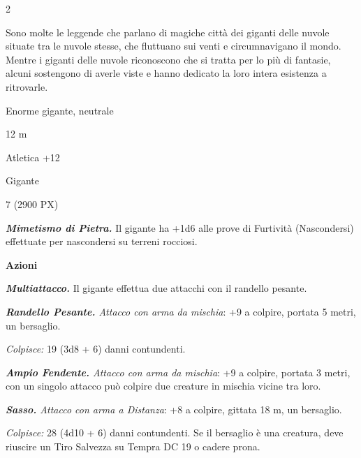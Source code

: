 \begin{multicols}{2}
{Sono molte le leggende che parlano di magiche città dei giganti delle nuvole situate tra le nuvole stesse, che fluttuano sui venti e circumnavigano il mondo. Mentre i giganti delle nuvole riconoscono che si tratta per lo più di fantasie, alcuni sostengono di averle viste e hanno dedicato la loro intera esistenza a ritrovarle.

\begin{description}[noitemsep, topsep=0pt, parsep=0pt, partopsep=0pt, itemsep=1pt, leftmargin=2.35cm,  labelwidth=2.2cm, itemindent=0cm, listparindent=0pt] %
\setlength{\baselineskip}{10pt}
\item[\textbf{Taglia/Tipo}] Enorme gigante, neutrale
\item[\textbf{Caratt.}] 
\item[\textbf{Punti Ferita}] 
\item[\textbf{Movimento}] 12 m
\item[\textbf{Tiri Salvez.}] 
\item[\textbf{Comp.}] Atletica +12
\item[\textbf{Sensi}] 
\item[\textbf{Linguaggi}] Gigante
\item[\textbf{Sfida}] 7 (2900 PX)
\end{description}
\smallskip

\emph{\textbf{Mimetismo di Pietra.}} Il gigante ha +1d6 alle prove di Furtività (Nascondersi) effettuate per nascondersi su terreni rocciosi.

\textbf{Azioni}

\emph{\textbf{Multiattacco.}} Il gigante effettua due attacchi con il randello pesante.

\emph{\textbf{Randello Pesante.} Attacco con arma da mischia}: +9 a colpire, portata 5 metri, un bersaglio.

\emph{Colpisce:} 19 (3d8 + 6) danni contundenti.

\emph{\textbf{Ampio Fendente.} Attacco con arma da mischia}: +9 a colpire, portata 3 metri, con un singolo attacco può colpire due creature in mischia vicine tra loro.

\emph{\textbf{Sasso.} Attacco con arma a Distanza}: +8 a colpire, gittata 18 m, un bersaglio.

\emph{Colpisce:} 28 (4d10 + 6) danni contundenti. Se il bersaglio è una creatura, deve riuscire un Tiro Salvezza su Tempra DC 19 o cadere prona.

}
\end{multicols}
